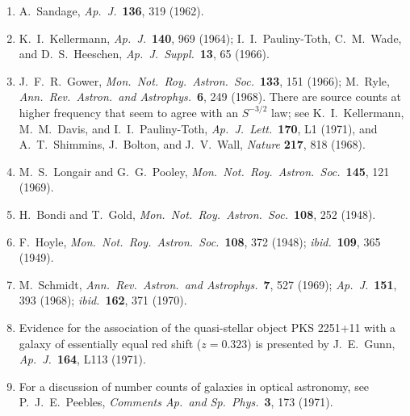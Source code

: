 \begin{enumerate}
  \item{}\label{ch14-ref-61}
  A.~Sandage, \emph{Ap.\ J.}\ \textbf{136}, 319 (1962).

  \item{}\label{ch14-ref-62}
  K.~I.~Kellermann, \emph{Ap.\ J.}\ \textbf{140}, 969 (1964);
  I.~I.~Pauliny-Toth, C.~M.~Wade, and D.~S.~Heeschen,
  \emph{Ap.\ J.\ Suppl.}\ \textbf{13}, 65 (1966).

  \item{}\label{ch14-ref-63}
  J.~F.~R.~Gower, \emph{Mon.\ Not.\ Roy.\ Astron.\ Soc.}\ \textbf{133},
  151 (1966);
  M.~Ryle, \emph{Ann.\ Rev.\ Astron.\ and Astrophys.}\ \textbf{6}, 249
  (1968).
  There are source counts at higher frequency that seem to agree with an
  \(S^{-3/2}\) law; see K.~I.~Kellermann, M.~M.~Davis, and
  I.~I.~Pauliny-Toth, \emph{Ap.\ J.\ Lett.}\ \textbf{170}, L1 (1971),
  and A.~T.~Shimmins, J.~Bolton, and J.~V.~Wall,
  \emph{Nature} \textbf{217}, 818 (1968).

  \item{}\label{ch14-ref-64}
  M.~S.~Longair and G.~G.~Pooley,
  \emph{Mon.\ Not.\ Roy.\ Astron.\ Soc.}\ \textbf{145}, 121 (1969).

  \item{}\label{ch14-ref-65}
  H.~Bondi and T.~Gold,
  \emph{Mon.\ Not.\ Roy.\ Astron.\ Soc.}\ \textbf{108}, 252 (1948).

  \item{}\label{ch14-ref-66}
  F.~Hoyle, \emph{Mon.\ Not.\ Roy.\ Astron.\ Soc.}\ \textbf{108}, 372
  (1948); \emph{ibid.}\ \textbf{109}, 365 (1949).

  \item{}\label{ch14-ref-67}
  M.~Schmidt, \emph{Ann.\ Rev.\ Astron.\ and Astrophys.}\ \textbf{7}, 527
  (1969); \emph{Ap.\ J.}\ \textbf{151}, 393 (1968);
  \emph{ibid.}\ \textbf{162}, 371 (1970).

  \item{}\label{ch14-ref-68}
  Evidence for the association of the quasi-stellar object PKS 2251+11
  with a galaxy of essentially equal red shift (\(z=0.323\)) is presented
  by J.~E.~Gunn, \emph{Ap.\ J.}\ \textbf{164}, L113 (1971).

  \item{}\label{ch14-ref-69}
  For a discussion of number counts of galaxies in optical astronomy, see
  P.~J.~E.~Peebles, \emph{Comments Ap.\ and Sp.\ Phys.}\ \textbf{3}, 173
  (1971).
\end{enumerate}
